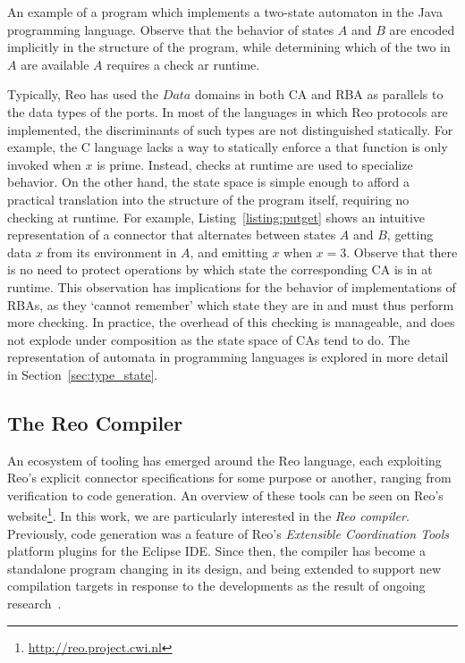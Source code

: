 \begin{listing}[ht]
	\inputminted[]{java}{putget.java}
	\caption[Type state automaton in Java.]{An example of a program which implements a two-state automaton in the Java programming language. Observe that the behavior of states $A$ and $B$ are encoded implicitly in the structure of the program, while determining which of the two in $A$ are available $A$ requires a check ar runtime.}
	\label{listing:putget}
\end{listing}
Typically, Reo has used the $Data$ domains in both CA and RBA as parallels to the data types of the ports. In most of the languages in which Reo protocols are implemented, the discriminants of such types are not distinguished statically. For example, the C language lacks a way to statically enforce a that function  is only invoked when $x$ is prime. Instead, checks at runtime are used to specialize behavior. On the other hand, the state space is simple enough to afford a practical translation into the structure of the program itself, requiring no checking at runtime. For example, Listing~\ref{listing:putget} shows an intuitive representation of a connector that alternates between states $A$ and $B$, getting data $x$ from its environment in $A$, and emitting $x$ when $x=3$. Observe that there is no need to protect operations by which state the corresponding CA is in at runtime. This observation has implications for the behavior of implementations of RBAs, as they `cannot remember' which state they are in and must thus perform more checking. In practice, the overhead of this checking is manageable, and does not explode under composition as the state space of CAs tend to do. The representation of automata in programming languages is explored in more detail in Section~\ref{sec:type_state}.

\subsection{The Reo Compiler}
An ecosystem of tooling has emerged around the Reo language, each exploiting Reo's explicit connector specifications for some purpose or another, ranging from verification to code generation. An overview of these tools can be seen on Reo's  website\footnote{\url{http://reo.project.cwi.nl}}. In this work, we are particularly interested in the \textit{Reo compiler}. Previously, code generation was a feature of Reo's \textit{Extensible Coordination Tools} platform plugins for the Eclipse IDE. Since then, the compiler has become a standalone program changing in its design, and being extended to support new compilation targets in response to the developments as the result of ongoing research~\cite{jongmans2012automatic, jongmans2015partially, dokter2018rule}.


